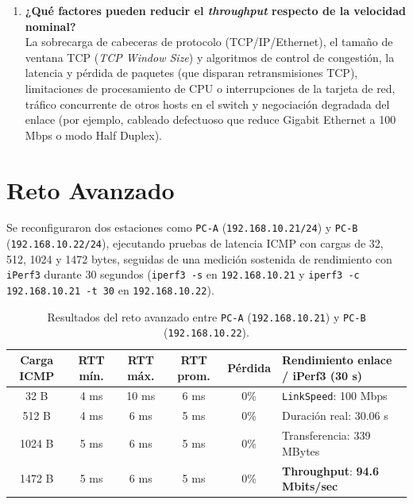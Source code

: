 \documentclass[11pt, a4paper]{article}
\begin{document}
\begin{enumerate}
    \item \textbf{¿Qué factores pueden reducir el \textit{throughput} respecto de la velocidad nominal?} \\
    La sobrecarga de cabeceras de protocolo (TCP/IP/Ethernet), el tamaño de ventana TCP (\textit{TCP Window Size}) y algoritmos de control de congestión, la latencia y pérdida de paquetes (que disparan retransmisiones TCP), limitaciones de procesamiento de CPU o interrupciones de la tarjeta de red, tráfico concurrente de otros hosts en el switch y negociación degradada del enlace (por ejemplo, cableado defectuoso que reduce Gigabit Ethernet a 100 Mbps o modo Half Duplex).
\end{enumerate}

\section{Reto Avanzado}

Se reconfiguraron dos estaciones como \texttt{PC-A} (\texttt{192.168.10.21/24}) y \texttt{PC-B} (\texttt{192.168.10.22/24}), ejecutando pruebas de latencia ICMP con cargas de 32, 512, 1024 y 1472 bytes, seguidas de una medición sostenida de rendimiento con \texttt{iPerf3} durante 30 segundos (\texttt{iperf3 -s} en \texttt{192.168.10.21} y \texttt{iperf3 -c 192.168.10.21 -t 30} en \texttt{192.168.10.22}).

\begin{table}[h!]
\centering
\small
\setlength{\tabcolsep}{4.5pt}
\caption{Resultados del reto avanzado entre \texttt{PC-A} (\texttt{192.168.10.21}) y \texttt{PC-B} (\texttt{192.168.10.22}).}
\begin{tabularx}{\textwidth}{ccccc>{\centering\arraybackslash}X}
\toprule
\textbf{Carga ICMP} & \textbf{RTT mín.} & \textbf{RTT máx.} & \textbf{RTT prom.} & \textbf{Pérdida} & \textbf{Rendimiento enlace / iPerf3 (30 s)} \\
\midrule
32 B   & 4 ms & 10 ms & 6 ms & 0\% & \texttt{LinkSpeed}: 100 Mbps \\
512 B  & 4 ms & 6 ms  & 5 ms & 0\% & Duración real: 30.06 s \\
1024 B & 5 ms & 6 ms  & 5 ms & 0\% & Transferencia: 339 MBytes \\
1472 B & 5 ms & 6 ms  & 5 ms & 0\% & \textbf{Throughput}: \textbf{94.6 Mbits/sec} \\
\bottomrule
\end{tabularx}
\end{table}
\end{document}

